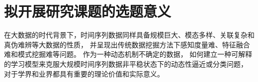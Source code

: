 \section{拟开展研究课题的选题意义}\label{sec:2.2}


在大数据的时代背景下，时间序列数据同样具备规模巨大、模态多样、关联复杂和真伪难辨等大数据的性质，
并呈现出传统数据挖掘方法下感知度量难、特征融合难和模式挖掘难等问题。
作为一种动态机制不确定的数据，
如何建立一种可解释的学习模型来克服大规模时间序列数据非平稳状态下的动态性逼近或分类问题，
对于学界和业界都具有重要的理论价值和实际意义。